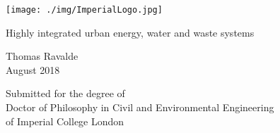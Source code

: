 \begin{titlepage}

  \texttt{[image: ./img/ImperialLogo.jpg]}\\[1cm]

    \begin{center}
        \vspace*{1cm}
        
        {\LARGE Highly integrated urban energy, water and waste systems}
        
        \vspace{1.5cm}
        
        Thomas Ravalde \\
        \vspace{0.8cm}
        August 2018
        
        \vfill
        
        Submitted for the degree of \\
	Doctor of Philosophy in Civil and Environmental Engineering\\
	of Imperial College London
        
    \end{center}

\end{titlepage}
